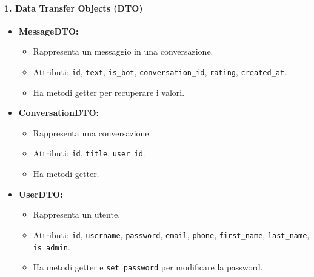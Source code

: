     \paragraph{1. Data Transfer Objects (DTO)}
    \begin{itemize}
        \item \textbf{MessageDTO:}
        \begin{itemize}
            \item Rappresenta un messaggio in una conversazione.
            \item Attributi: \texttt{id}, \texttt{text}, \texttt{is\_bot}, \texttt{conversation\_id}, \texttt{rating}, \texttt{created\_at}.
            \item Ha metodi getter per recuperare i valori.
        \end{itemize}
        \item \textbf{ConversationDTO:}
        \begin{itemize}
            \item Rappresenta una conversazione.
            \item Attributi: \texttt{id}, \texttt{title}, \texttt{user\_id}.
            \item Ha metodi getter.
        \end{itemize}
        \item \textbf{UserDTO:}
        \begin{itemize}
            \item Rappresenta un utente.
            \item Attributi: \texttt{id}, \texttt{username}, \texttt{password}, \texttt{email}, \texttt{phone}, \texttt{first\_name}, \texttt{last\_name}, \texttt{is\_admin}.
            \item Ha metodi getter e \texttt{set\_password} per modificare la password.
        \end{itemize}
    \end{itemize}

